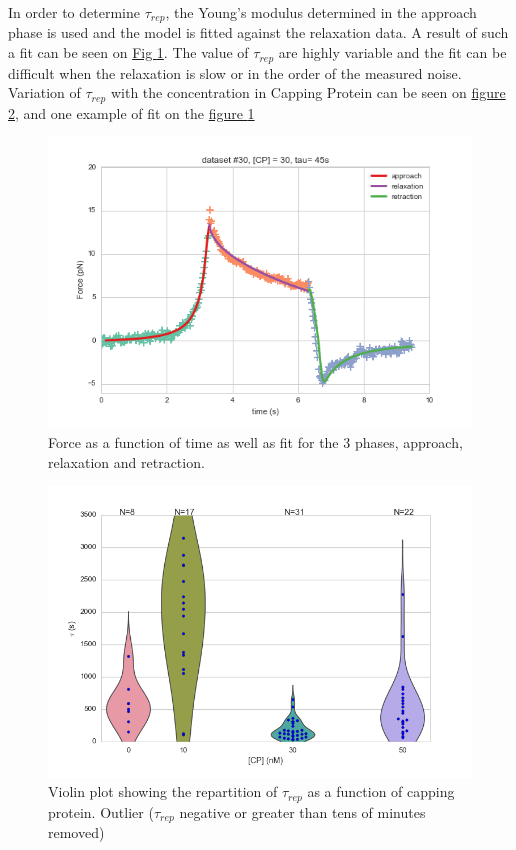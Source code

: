 \documentclass[A4paperpaper,11pt,english]{sphinxmanual}
\begin{document}
In order to determine \(\tau_{rep}\), the Young's modulus determined in the
approach phase is used and the model is fitted against the relaxation data.  A
result of such a fit can be seen on \hyperref[parts/part3:fit-3-phases]{Fig  \ref*{parts/part3:fit-3-phases}}. The value of
\(\tau_{rep}\) are highly variable and the fit can be difficult when the relaxation is
slow or in the order of the measured noise. Variation of \(\tau_{rep}\) with the
concentration in Capping Protein can be seen on \hyperref[parts/part3:tau-violin]{figure  \ref*{parts/part3:tau-violin}}, and
one example of fit on the \hyperref[parts/part3:fit-3-phases]{figure  \ref*{parts/part3:fit-3-phases}}
\begin{figure}[htbp]
\centering
\capstart

\includegraphics[width=0.800\linewidth]{3phases.png}
\caption{Force as a function of time as well as fit for the 3 phases, approach,
relaxation and retraction.}\label{parts/part3:fit-3-phases}\end{figure}
\begin{figure}[htbp]
\centering
\capstart

\includegraphics[width=0.800\linewidth]{tau_violin.png}
\caption{Violin plot showing the repartition of \(\tau_{rep}\) as a function of capping
protein. Outlier (\(\tau_{rep}\) negative or greater than tens of minutes removed)}\label{parts/part3:tau-violin}\end{figure}
\end{document}
